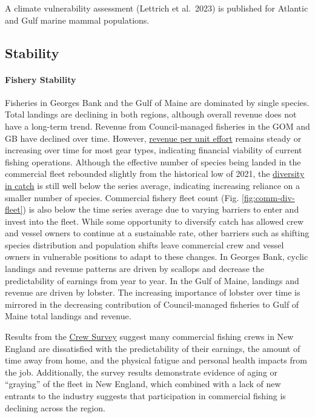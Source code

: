 \documentclass[
  10pt,
]{article}
\begin{document}
A climate vulnerability assessment (Lettrich et al.~2023) is published for Atlantic and Gulf marine mammal populations.

\subsection{Stability}\label{stability}

\paragraph{Fishery Stability}\label{fishery-stability}

Fisheries in Georges Bank and the Gulf of Maine are dominated by single species. Total landings are declining in both regions, although overall revenue does not have a long-term trend. Revenue from Council-managed fisheries in the GOM and GB have declined over time. However, \href{https://noaa-edab.github.io/catalog/effective_sweptarea.html}{revenue per unit effort} remains steady or increasing over time for most gear types, indicating financial viability of current fishing operations. Although the effective number of species being landed in the commercial fleet rebounded slightly from the historical low of 2021, the \href{https://noaa-edab.github.io/catalog/recdat.html}{diversity in catch} is still well below the series average, indicating increasing reliance on a smaller number of species. Commercial fishery fleet count (Fig. \ref{fig:comm-div-fleet}) is also below the time series average due to varying barriers to enter and invest into the fleet. While some opportunity to diversify catch has allowed crew and vessel owners to continue at a sustainable rate, other barriers such as shifting species distribution and population shifts leave commercial crew and vessel owners in vulnerable positions to adapt to these changes. In Georges Bank, cyclic landings and revenue patterns are driven by scallops and decrease the predictability of earnings from year to year. In the Gulf of Maine, landings and revenue are driven by lobster. The increasing importance of lobster over time is mirrored in the decreasing contribution of Council-managed fisheries to Gulf of Maine total landings and revenue.

Results from the \href{https://noaa-edab.github.io/catalog/crew_survey.html}{Crew Survey} suggest many commercial fishing crews in New England are dissatisfied with the predictability of their earnings, the amount of time away from home, and the physical fatigue and personal health impacts from the job. Additionally, the survey results demonstrate evidence of aging or ``graying'' of the fleet in New England, which combined with a lack of new entrants to the industry suggests that participation in commercial fishing is declining across the region.
\end{document}
